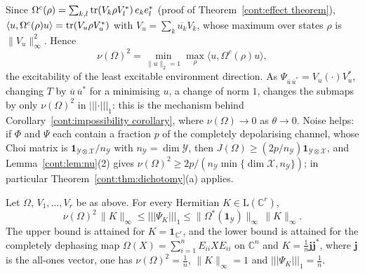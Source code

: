 \begin{remark}\label{cont:rem:phys-nu}
Since $\Omega^c(\rho)=\sum_{k,l}\operatorname{tr}(V_k\rho V_l^*)\,e_ke_l^*$ (proof of Theorem~\ref{cont:effect theorem}), $\langle u,\Omega^c(\rho)u\rangle=\operatorname{tr}(V_u\rho V_u^*)$ with $V_u=\sum_k\overline{u_k}V_k$, whose maximum over states $\rho$ is $\|V_u\|_\infty^2$. Hence
\[
\nu(\Omega)^2=\min_{\|u\|_2=1}\max_\rho\langle u,\Omega^c(\rho)u\rangle,
\]
the excitability of the least excitable environment direction. As $\Psi_{\overline{u}\,\overline{u}^*}=V_u(\cdot)V_u^*$, changing $T$ by $\overline{u}\,\overline{u}^*$ for a minimising $u$, a change of norm $1$, changes the submaps by only $\nu(\Omega)^2$ in $|||\cdot|||_1$: this is the mechanism behind Corollary~\ref{cont:impossibility corollary}, where $\nu(\Omega)\to0$ as $\theta\to0$. Noise helps: if $\Phi$ and $\Psi$ each contain a fraction $p$ of the completely depolarising channel, whose Choi matrix is $\mathbf{1}_{\mathcal{Y}\otimes\mathcal{X}}/n_{\mathcal{Y}}$ with $n_{\mathcal{Y}}=\dim\mathcal{Y}$, then $J(\Omega)\geq(2p/n_{\mathcal{Y}})\mathbf{1}_{\mathcal{Y}\otimes\mathcal{X}}$, and Lemma~\ref{cont:lem:nu}(2) gives $\nu(\Omega)^2\geq2p/(n_{\mathcal{Y}}\min\{\dim\mathcal{X},n_{\mathcal{Y}}\})$; in particular Theorem~\ref{cont:thm:dichotomy}(a) applies.
\end{remark}

\begin{theorem}\label{cont:thm:two sided}
Let $\Omega$, $V_1,\dots,V_r$ be as above. For every Hermitian $K\in\mathrm{L}(\mathbb{C}^r)$,
\[
\nu(\Omega)^2\,\|K\|_\infty\leq|||\Psi_K|||_1\leq\|\Omega^*(\mathbf{1}_{\mathcal{Y}})\|_\infty\,\|K\|_\infty .
\]
The upper bound is attained for $K=\mathbf{1}_{\mathbb{C}^r}$, and the lower bound is attained for the completely dephasing map $\Omega(X)=\sum_{i=1}^nE_{ii}XE_{ii}$ on $\mathbb{C}^n$ and $K=\frac1n\mathbf{j}\mathbf{j}^*$, where $\mathbf{j}$ is the all-ones vector, one has $\nu(\Omega)^2=\frac1n$, $\|K\|_\infty=1$ and $|||\Psi_K|||_1=\frac1n$.
\end{theorem}

